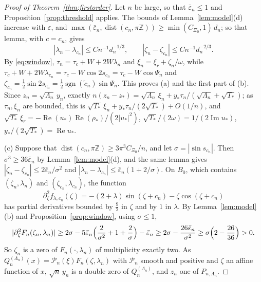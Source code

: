 \documentclass[11pt]{amsart}
\theoremstyle{definition}
\theoremstyle{remark}
\numberwithin{equation}{section}
\newcommand{\Z}{\mathbb{Z}}
\newcommand{\eps}{\varepsilon}
\DeclareMathOperator{\re}{Re}
\DeclareMathOperator{\im}{Im}
\DeclareMathOperator{\dist}{dist}
\begin{document}
\begin{proof}[Proof of Theorem~\ref{thm:firstorder}]
Let $n$ be large, so that $\bar\eps_n\le1$ and Proposition~\ref{prop:threshold} applies. The bounds of
Lemma~\ref{lem:model}(d) increase with $\eps$, and $\max(\bar\eps_n,\dist(c_n,\pi\Z))\ge\min(C_{\Xi_0},1)\,d_n$; so that lemma,
with $c=c_n$, gives
\[
|\lambda_n-\lambda_{c_n}|\le Cn^{-1}d_n^{-1/3},\qquad|\zeta_n-\zeta_{c_n}|\le Cn^{-1}d_n^{-2/3}.
\]
By \eqref{eq:window}, $\tau_n=\tau_c+W+2W\lambda_n$ and $\xi_n=\xi_r+\zeta_n/\omega$, while
$\tau_c+W+2W\lambda_{c_n}=\tau_c-W\cos2s_{c_n}=\tau_c-W\cos\Psi_n$ and
$\zeta_{c_n}=\frac12\sin2s_{c_n}=\frac12\operatorname{sgn}(\tilde c_n)\sin\Psi_n$. This proves (a) and the first part of (b).
Since $z_n=\sqrt{\Lambda_n}\,y_n$, exactly $n(z_n-z_*)=\sqrt{\Lambda_n}\,\xi_n+y_*\tau_n/(\sqrt{\Lambda_n}+\sqrt{T_*})$; as
$\tau_n,\xi_n$ are bounded, this is $\sqrt{T_*}\,\xi_n+y_*\tau_n/(2\sqrt{T_*})+O(1/n)$, and
$\sqrt{T_*}\,\xi_r=-\re(u_*)\re(\rho_*)/(2|u_*|^2)$, $\sqrt{T_*}/(2\omega)=1/(2\im u_*)$, $y_*/(2\sqrt{T_*})=\re u_*$.

(c) Suppose that $\dist(c_n,\pi\Z)\ge3\pi^3C_{\Xi_0}/n$, and let $\sigma=|\sin s_{c_n}|$. Then $\sigma^3\ge36\bar\eps_n$ by
Lemma~\ref{lem:model}(d), and the same lemma gives $|\zeta_n-\zeta_{c_n}|\le2\bar\eps_n/\sigma^2$ and $|\lambda_n-\lambda_{c_n}|\le\bar\eps_n(1+2/\sigma)$.
On $B_0$, which contains $(\zeta_n,\lambda_n)$ and $(\zeta_{c_n},\lambda_{c_n})$, the function
\[
\partial_\zeta^2f_{\lambda,c_n}(\zeta)=-(2+\lambda)\sin(\zeta+c_n)-\zeta\cos(\zeta+c_n)
\]
has partial derivatives bounded by
$\frac92$ in $\zeta$ and by $1$ in $\lambda$. By Lemma~\ref{lem:model}(b) and Proposition~\ref{prop:window}, using
$\sigma\le1$,
\[
|\partial_\zeta^2F_n(\zeta_n,\lambda_n)|\ge2\sigma-5\bar\eps_n\Bigl(\frac2{\sigma^2}+1+\frac2\sigma\Bigr)-\bar\eps_n
\ge2\sigma-\frac{26\bar\eps_n}{\sigma^2}\ge\sigma\Bigl(2-\frac{26}{36}\Bigr)>0 .
\]
So $\zeta_n$ is a zero of $F_n(\cdot,\lambda_n)$ of multiplicity exactly two. As
$Q_n^{(\Lambda_n)}(x)=\mathcal P_n(\xi)F_n(\zeta,\lambda_n)$ with $\mathcal P_n$ smooth and positive and $\zeta$ an affine
function of $x$, $\sqrt n\,y_n$ is a double zero of $Q_n^{(\Lambda_n)}$, and $z_n$ one of $P_{n,\Lambda_n}$.
\end{proof}
\end{document}
